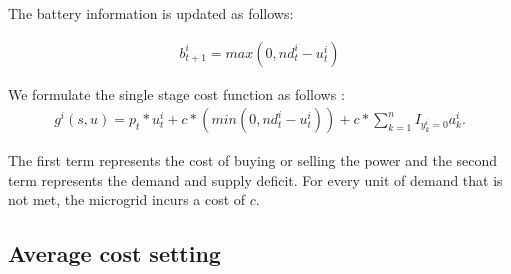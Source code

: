 The battery information is updated as follows:

\begin{align}
b_{t+1}^{i} = max(0,nd_{t}^{i} - u_{t}^{i})
\end{align}

We formulate the single stage cost function as follows :
\begin{align}
g^{i}(s,u) = p_{t}*u_{t}^{i} + c*(min(0,nd_{t}^{i} - u_{t}^{i})) + c* \sum_{k =1}^{n} I_{y_{k}^{i} = 0} a_{k}^{i}.
\end{align}

The first term represents the cost of buying or selling the power and the second term represents the demand and supply deficit. For every unit of demand that is not met, the microgrid incurs a cost of $c$. 

\subsection{Average cost setting}